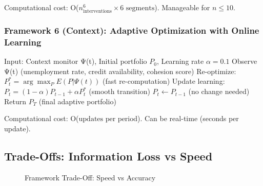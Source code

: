Computational cost: O($n_{\text{interventions}}^6 \times 6 \text{ segments}$). Manageable for $n \leq 10$.

\subsubsection{Framework 6 (Context): Adaptive Optimization with Online Learning}

\begin{algorithm}[H]
\caption{Framework 6 Context-Adaptive Portfolio Optimization}
\begin{algorithmic}[1]
\State Input: Context monitor Ψ(t), Initial portfolio $P_0$, Learning rate $\alpha = 0.1$
    \State Observe Ψ(t) (unemployment rate, credit availability, cohesion score)
        \State Re-optimize: $P_t^* = \arg\max_P E(P | \Psi(t))$ (fast re-computation)
        \State Update learning: $P_t = (1 - \alpha) P_{t-1} + \alpha P_t^*$ (smooth transition)
    \Else
        \State $P_t \leftarrow P_{t-1}$ (no change needed)
    \EndIf
\EndFor
\State Return $P_T$ (final adaptive portfolio)
\end{algorithmic}
\end{algorithm}

Computational cost: O($\text{updates per period}$). Can be real-time (seconds per update).

\subsection{Trade-Offs: Information Loss vs Speed}

\begin{figure}[htbp]
\centering
{}
\caption{Framework Trade-Off: Speed vs Accuracy}
\label{fig:20-speed-accuracy-tradeoff}
\end{figure}

